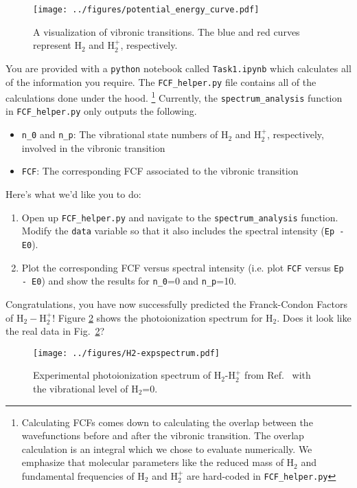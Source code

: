 \documentclass[12pt]{article}
\begin{document}
\begin{figure} 
    \begin{center}
        \texttt{[image: ../figures/potential\_energy\_curve.pdf]}
    \end{center}
    \caption{A visualization of vibronic transitions. The blue and red curves represent H$_2$ and H$_2^+$, respectively.}
        \label{fig:visualize_vibronic}
\end{figure}

You are provided with a \texttt{python} notebook called \texttt{Task1.ipynb} which calculates all of the information you require. The \texttt{FCF\_helper.py} file contains all of the calculations done under the hood. \footnote{Calculating FCFs comes down to calculating the overlap between the wavefunctions before and after the vibronic transition. The overlap calculation is an integral which we chose to evaluate numerically. We emphasize that molecular parameters like the reduced mass of H$_2$ and fundamental frequencies of H$_2$ and H$_2^+$ are hard-coded in \texttt{FCF\_helper.py}} Currently, the \texttt{spectrum\_analysis} function in \texttt{FCF\_helper.py} only outputs the following.
\begin{itemize}
    \item \texttt{n\_0} and \texttt{n\_p}: The vibrational state numbers of H$_2$ and H$_2^+$, respectively, involved in the vibronic transition
    \item \texttt{FCF}: The corresponding FCF associated to the vibronic transition
\end{itemize}
Here's what we'd like you to do:
\begin{enumerate}
    \item Open up \texttt{FCF\_helper.py} and navigate to the \texttt{spectrum\_analysis} function. Modify the \texttt{data} variable so that it also includes the spectral intensity (\texttt{Ep - E0}).
    \item Plot the corresponding FCF versus spectral intensity (i.e. plot \texttt{FCF} versus \texttt{Ep - E0}) and show the results for \texttt{n\_0}=0 and \texttt{n\_p}=10.
\end{enumerate}

Congratulations, you have now successfully predicted the Franck-Condon Factors of H$_2-$H$_2^+$! Figure \ref{fig:h2_spectrum} shows the photoionization spectrum for H$_2$. Does it look like the real data in Fig.~\ref{fig:h2_spectrum}?

\begin{figure}
    \begin{center}
        \texttt{[image: ../figures/H2-expspectrum.pdf]}
    \end{center}
    \caption{
    Experimental photoionization spectrum of H$_2$-H$_2^+$ from Ref.~\cite{berkowitz1973comparison} with the vibrational level of H$_2$=0.
    }
    \label{fig:h2_spectrum}
\end{figure}
\end{document}
